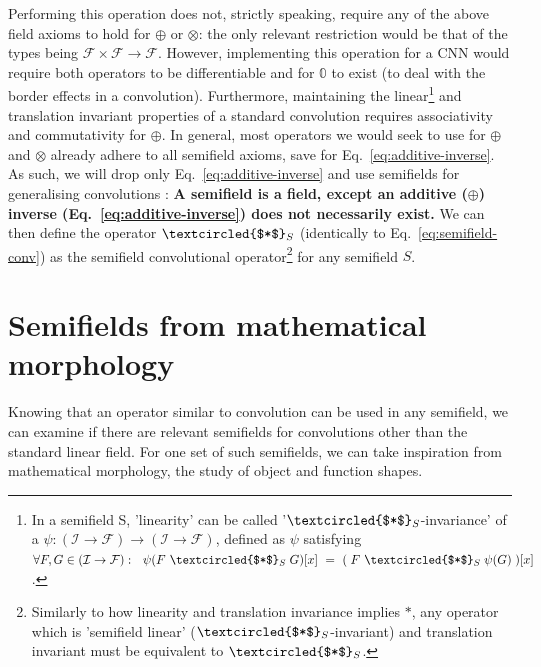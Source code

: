 \documentclass[a4paper, 12pt]{report}
\begin{document}
\noindent
Performing this operation does not, strictly speaking, require any of the above field axioms to hold for $\oplus$ or $\otimes$: the only relevant restriction would be that of the types being $\mathcal{F}\times\mathcal{F}\rightarrow\mathcal{F}$. However, implementing this operation for a CNN would require both operators to be differentiable and for $\mathbb{0}$ to exist (to deal with the border effects in a convolution).
Furthermore, maintaining the linear\footnote{In a semifield S, 'linearity' can be called '$\textcircled{$*$}_S$-invariance' of a $\psi:(\mathcal{I}\rightarrow\mathcal{F})\rightarrow(\mathcal{I}\rightarrow\mathcal{F})$, defined as $\psi$ satisfying $\forall F, G\in (\mathcal{I}\rightarrow\mathcal{F}):~~\psi(F ~\textcircled{$*$}_S\; G)[x]~=~(\;F ~\textcircled{$*$}_S\; \psi(G)\;)[x]$.} and translation invariant properties of a standard convolution requires associativity and commutativity for $\oplus$.
In general, most operators we would seek to use for $\oplus$ and $\otimes$ already adhere to all semifield axioms, save for Eq.\ \ref{eq:additive-inverse}. As such, we will drop only Eq.\ \ref{eq:additive-inverse} and use semifields for generalising convolutions \cite{bellaardaxiomatic, beachy2006abstract}:
\textbf{A semifield is a field, except an additive ($\oplus$) inverse (Eq.\ \ref{eq:additive-inverse}) does not necessarily exist.}
We can then define the operator $\textcircled{$*$}_S$ (identically to Eq.\ \ref{eq:semifield-conv}) as the semifield convolutional operator\footnote{Similarly to how linearity and translation invariance implies $*$, any operator which is 'semifield linear' ($\textcircled{$*$}_S$-invariant) and translation invariant must be equivalent to $\textcircled{$*$}_S$.} for any semifield $S$.

\section{Semifields from mathematical morphology}
Knowing that an operator similar to convolution can be used in any semifield, we can examine if there are relevant semifields for convolutions other than the standard linear field. For one set of such semifields, we can take inspiration from mathematical morphology, the study of object and function shapes.
\end{document}
